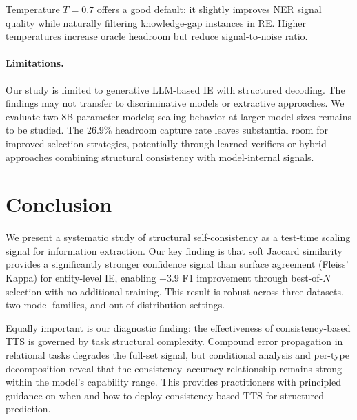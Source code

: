 \documentclass[11pt,a4paper]{article}
\begin{document}
Temperature $T\!=\!0.7$ offers a good default: it slightly improves NER signal quality while naturally filtering knowledge-gap instances in RE. Higher temperatures increase oracle headroom but reduce signal-to-noise ratio.

\paragraph{Limitations.}
Our study is limited to generative LLM-based IE with structured decoding. The findings may not transfer to discriminative models or extractive approaches. We evaluate two 8B-parameter models; scaling behavior at larger model sizes remains to be studied. The 26.9\% headroom capture rate leaves substantial room for improved selection strategies, potentially through learned verifiers or hybrid approaches combining structural consistency with model-internal signals.

\section{Conclusion}

We present a systematic study of structural self-consistency as a test-time scaling signal for information extraction. Our key finding is that soft Jaccard similarity provides a significantly stronger confidence signal than surface agreement (Fleiss' Kappa) for entity-level IE, enabling +3.9 F1 improvement through best-of-$N$ selection with no additional training. This result is robust across three datasets, two model families, and out-of-distribution settings.

Equally important is our diagnostic finding: the effectiveness of consistency-based TTS is governed by task structural complexity. Compound error propagation in relational tasks degrades the full-set signal, but conditional analysis and per-type decomposition reveal that the consistency--accuracy relationship remains strong within the model's capability range. This provides practitioners with principled guidance on when and how to deploy consistency-based TTS for structured prediction.
\end{document}
